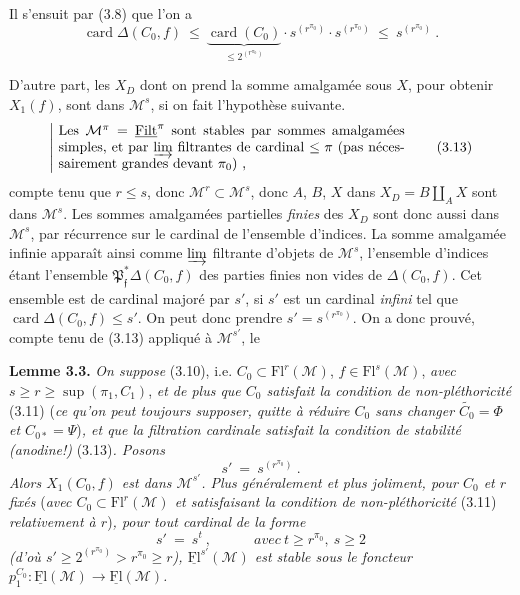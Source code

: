 \documentclass[11pt]{article}
\newcommand{\msp}[1]{\marginpar{\footnotesize [#1]}}
\newcommand{\M}{\mathcal{M}}
\newcommand{\Fl}{\mathrm{Fl}}
\newcommand{\uFl}{\underline{\mathrm{Fl}}}
\newcommand{\card}{\operatorname{card}}
\newcommand{\uFilt}{\underline{\mathrm{Filt}}}
\begin{document}
Il s'ensuit par (3.8) que l'on a
\[
\card\Delta(C_0,f)\ \leq\ \underbrace{\card(C_0)}_{\leq 2^{(r^{\pi_0})}}\cdot s^{(r^{\pi_0})}\cdot s^{(r^{\pi_0})}\ \leq\ s^{(r^{\pi_0})}\ .
\]

D'autre part, les $X_D$ dont on prend la somme amalgamée sous $X$, pour obtenir $X_1(f)$, sont dans $\M^s$, si on fait l'hypothèse suivante. \msp{page 25}
\[
\left|\ \parbox{0.72\linewidth}{Les $\M^\pi=\uFilt^\pi$ sont stables par sommes amalgamées simples, et par $\varinjlim$ filtrantes de cardinal $\leq\pi$ (pas nécessairement grandes devant $\pi_0$) ,}\right. \tag*{(3.13)}
\]
compte tenu que $r\leq s$, donc $\M^r\subset\M^s$, donc $A$, $B$, $X$ dans $X_D=B\amalg_A X$ sont dans $\M^s$. Les sommes amalgamées partielles \textit{finies} des $X_D$ sont donc aussi dans $\M^s$, par récurrence sur le cardinal de l'ensemble d'indices. La somme amalgamée infinie apparaît ainsi comme $\varinjlim$ filtrante d'objets de $\M^s$, l'ensemble d'indices étant l'ensemble $\mathfrak{P}^*_{\mathfrak{f}}\Delta(C_0,f)$ des parties finies non vides de $\Delta(C_0,f)$. Cet ensemble est de cardinal majoré par $s'$, si $s'$ est un cardinal \textit{infini} tel que $\card\Delta(C_0,f)\leq s'$. On peut donc prendre $s'=s^{(r^{\pi_0})}$. On a donc prouvé, compte tenu de (3.13) appliqué à $\M^{s'}$, le %

\textbf{Lemme 3.3.} \textit{On suppose} \textup{(3.10), i.e.} $C_0\subset\Fl^r(\M)$, $f\in\Fl^s(\M)$, \textit{avec} $s\geq r\geq\sup(\pi_1,C_1)$, \textit{et de plus que $C_0$ satisfait la condition de non-pléthoricité} \textup{(3.11)} \textup{(}\textit{ce qu'on peut toujours supposer, quitte à réduire $C_0$ sans changer $\widetilde{C_0}=\Phi$ et $C_{0*}=\Psi$}\textup{)}\textit{, et que la filtration cardinale satisfait la condition de stabilité (anodine!)} \textup{(3.13)}\textit{. Posons}
\[
s'\ =\ s^{(r^{\pi_0})}\ . \tag*{(3.14)}
\]
\textit{Alors $X_1(C_0,f)$ est dans $\M^{s'}$. Plus généralement et plus joliment, pour $C_0$ et $r$ fixés} \textup{(}\textit{avec $C_0\subset\Fl^r(\M)$ et satisfaisant la condition de non-pléthoricité} \textup{(3.11)} \textit{relativement à $r$}\textup{)}\textit{, pour tout cardinal} \msp{page 26} \textit{de la forme}
\[
s'\ =\ s^t\ ,\qquad\quad\textit{avec}\ t\geq r^{\pi_0},\ s\geq 2 \tag*{(3.15)}
\]
\textit{(d'où $s'\geq 2^{(r^{\pi_0})}>r^{\pi_0}\geq r$), $\uFl^{s'}(\M)$ est stable sous le foncteur $p_1^{C_0}:\uFl(\M)\longrightarrow\uFl(\M)$.}
\end{document}
